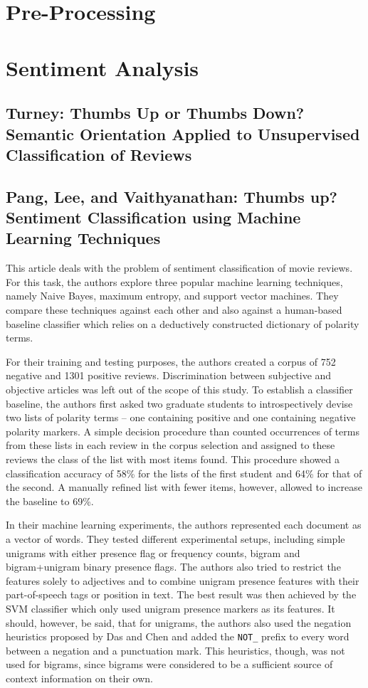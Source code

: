 \documentclass[a4paper,11pt]{article}
\begin{document}
\section{Pre-Processing}

\section{Sentiment Analysis}
\subsection{Turney: Thumbs Up or Thumbs Down? Semantic Orientation Applied to
               Unsupervised Classification of Reviews\cite{Turney-02}}

\subsection{Pang, Lee, and Vaithyanathan: Thumbs up? Sentiment Classification using Machine
                  Learning Techniques\cite{Pang-Lee-02}}

This article deals with the problem of sentiment classification of
movie reviews.  For this task, the authors explore three popular
machine learning techniques, namely Naive Bayes, maximum entropy, and
support vector machines.  They compare these techniques against each
other and also against a human-based baseline classifier which relies
on a deductively constructed dictionary of polarity terms.

For their training and testing purposes, the authors created a corpus of 752
negative and 1301 positive reviews.  Discrimination between subjective and
objective articles was left out of the scope of this study.  To establish a
classifier baseline, the authors first asked two graduate students to
introspectively devise two lists of polarity terms -- one containing positive
and one containing negative polarity markers.  A simple decision procedure
than counted occurrences of terms from these lists in each review in the
corpus selection and assigned to these reviews the class of the list with most
items found.  This procedure showed a classification accuracy of 58\% for the
lists of the first student and 64\% for that of the second.  A manually
refined list with fewer items, however, allowed to increase the baseline to
69\%.

In their machine learning experiments, the authors represented each document
as a vector of words.  They tested different experimental setups, including
simple unigrams with either presence flag or frequency counts, bigram and
bigram+unigram binary presence flags.  The authors also tried to restrict the
features solely to adjectives and to combine unigram presence features with
their part-of-speech tags or position in text.  The best result was then
achieved by the SVM classifier which only used unigram presence markers as its
features.  It should, however, be said, that for unigrams, the authors also
used the negation heuristics proposed by Das and Chen \cite{Das-Chen-01} and
added the \texttt{NOT\_} prefix to every word between a negation and a
punctuation mark.  This heuristics, though, was not used for bigrams, since
bigrams were considered to be a sufficient source of context information on
their own.
\end{document}
